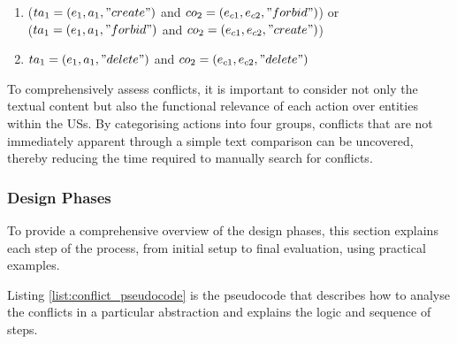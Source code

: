 \begin{definition}
\begin{enumerate}
\begin{enumerate}
			\item ($ta_1 = (e_1,a_1,"create")$ and $co_2 = (e_{c1},e_{c2},"forbid")$) or \\($ta_1 = (e_1,a_1,"forbid")$ and $co_2 = (e_{c1},e_{c2},"create")$)\\
			
			\item $ta_1 = (e_1,a_1,"delete")$ and $co_2 = (e_{c1},e_{c2},"delete")$
		\end{enumerate}
	\end{enumerate}
	 
	To comprehensively assess conflicts, it is important to consider not only the textual content but also the functional relevance of each action over entities within the USs. By categorising actions into four groups, conflicts that are not immediately apparent through a simple text comparison can be uncovered, thereby reducing the time required to manually search for conflicts.
\end{definition}	
\subsubsection*{Design Phases}\label{conflict_design_phases}
To provide a comprehensive overview of the design phases, this section explains each step of the process, from initial setup to final evaluation, using practical examples.

Listing \ref{list:conflict_pseudocode} is the pseudocode that describes how to analyse the conflicts in a particular abstraction and explains the logic and sequence of steps.


